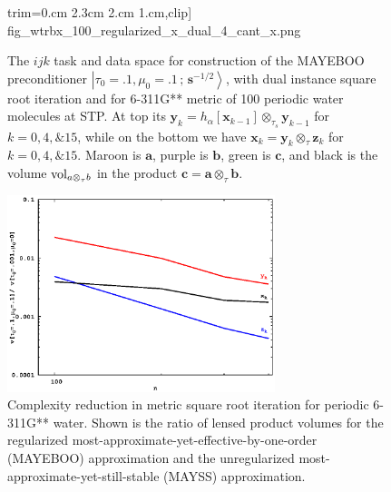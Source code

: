 \documentclass[letterpaper,twocolumn,amsmath,amsfont,amssymb,english,aps,jcp,preprintnumbers,groupaddress,nofootinbib,tightenlines,floatfix]{revtex4}
\newcommand{\mat}[1]{\boldsymbol{#1}}
\newcommand{\ot}{  {\scriptstyle \otimes}_{ \tau } }
\newcommand{\ots}{ {\scriptstyle \otimes}_{ \! \tau_s } }
\theoremstyle{plain}
\theoremstyle{remark}
\theoremstyle{plain}
\begin{document}
\begin{figure}[tb]
{                        trim={0.cm 2.3cm 2.cm 1.cm},clip]
                        {fig_wtrbx_100_regularized_x_dual_4_cant_x.png}} 
\caption{
The $ijk$ task and data space for construction of the MAYEBOO preconditioner 
$\left|\tau_0=.1,\mu_0=.1\, ; \,\scriptstyle{\mat{s}^{-1/2}} \right>$, with 
dual instance square root iteration  and for 6-311G** metric of 100 periodic water molecules
at STP.  At top its  $\mat{y}_k=h_\alpha[ \mat{x}_{k-1} ] \ots \mat{y}_{k-1}$
for $k=0,4,\& 15$, while on the bottom we have $\mat{x}_k=  \mat{y}_{k}  \ot \mat{z}_{k}$ for $k=0,4, \& 15$.
Maroon is $\mat{a}$, purple is $\mat{b}$, green is $\mat{c}$,  and black is the volume ${\rm vol}_{a \ot b}$
in the product $\mat{c}=\mat{a} \ot \mat{b}$.}\label{Lensing2}
\end{figure}

\begin{figure}[tb] 
\includegraphics[width=7.8cm,keepaspectratio=true,trim={0.cm 0.cm 0.cm 0.cm},clip]
                 {fig_regular_and_unleaded_pcnt_volume_water_boxes.eps} 
\caption{ 
Complexity reduction in metric square root iteration for periodic 6-311G** water. 
Shown is the ratio of lensed product volumes for the regularized most-approximate-yet-effective-by-one-order (MAYEBOO) 
approximation and the unregularized most-approximate-yet-still-stable (MAYSS) approximation.}\label{Complex1}
\end{figure}
\end{document}
